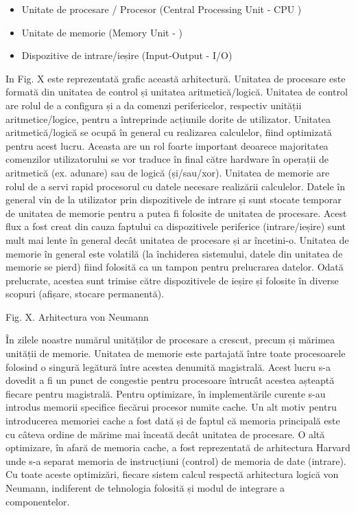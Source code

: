 \begin{itemize}
	\item Unitate de procesare / Procesor (Central Processing Unit - CPU
		)
	\item Unitate de memorie (Memory Unit - )
	\item Dispozitive de intrare/ieșire (Input-Output - I/O)
\end{itemize}

In Fig. X este reprezentată grafic această arhitectură. Unitatea de procesare
este formată din unitatea de control și unitatea aritmetică/logică. Unitatea de
control are rolul de a configura și a da comenzi perifericelor, respectiv
unității aritmetice/logice, pentru a întreprinde acțiunile dorite de utilizator.
Unitatea aritmetică/logică se ocupă în general cu realizarea calculelor, fiind
optimizată pentru acest lucru. Aceasta are un rol foarte important deoarece
majoritatea comenzilor utilizatorului se vor traduce în final către hardware în
operații de aritmetică (ex. adunare) sau de logică (și/sau/xor). Unitatea de
memorie are rolul de a servi rapid procesorul cu datele necesare realizării
calculelor. Datele în general vin de la utilizator prin dispozitivele de intrare
și sunt stocate temporar de unitatea de memorie pentru a putea fi folosite de
unitatea de procesare. Acest flux a fost creat din cauza faptului ca
dispozitivele periferice (intrare/ieșire) sunt mult mai lente în general decât
unitatea de procesare și ar încetini-o. Unitatea de memorie în general este
volatilă (la închiderea sistemului, datele din unitatea de memorie se pierd)
fiind folosită ca un tampon pentru prelucrarea datelor. Odată prelucrate,
acestea sunt trimise către dispozitivele de ieșire și folosite în diverse
scopuri (afișare, stocare permanentă).

Fig. X. Arhitectura von Neumann

În zilele noastre numărul unităților de procesare a crescut, precum și mărimea
unității de memorie. Unitatea de memorie este partajată între toate
procesoarele folosind o singură legătură între acestea denumită magistrală.
Acest lucru s-a dovedit a fi un punct de congestie pentru procesoare întrucât
acestea așteaptă fiecare pentru magistrală. Pentru optimizare, în implementările
curente s-au introdus memorii specifice fiecărui procesor numite cache. Un alt
motiv pentru introducerea memoriei cache a fost dată și de faptul că memoria
principală este cu câteva ordine de mărime mai înceată decât unitatea de
procesare. O altă optimizare, în afară de memoria cache, a fost reprezentată de
arhitectura Harvard unde s-a separat memoria de instrucțiuni (control) de
memoria de date (intrare). Cu toate aceste optimizări, fiecare sistem calcul
respectă arhitectura logică von Neumann, indiferent de tehnologia folosită și
modul de integrare a componentelor.

